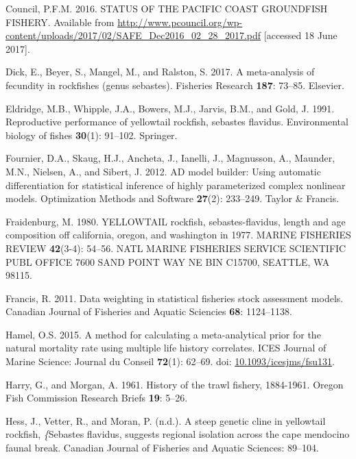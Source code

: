 \documentclass[12pt,]{article}
\begin{document}
\hypertarget{ref-PFMC2016}{}
Council, P.F.M. 2016. STATUS OF THE PACIFIC COAST GROUNDFISH FISHERY.
Available from
\url{http://www.pcouncil.org/wp-content/uploads/2017/02/SAFE_Dec2016_02_28_2017.pdf}
{[}accessed 18 June 2017{]}.

\hypertarget{ref-Dick2017}{}
Dick, E., Beyer, S., Mangel, M., and Ralston, S. 2017. A meta-analysis
of fecundity in rockfishes (genus sebastes). Fisheries Research
\textbf{187}: 73--85. Elsevier.

\hypertarget{ref-Eldridge1991}{}
Eldridge, M.B., Whipple, J.A., Bowers, M.J., Jarvis, B.M., and Gold, J.
1991. Reproductive performance of yellowtail rockfish, sebastes
flavidus. Environmental biology of fishes \textbf{30}(1): 91--102.
Springer.

\hypertarget{ref-Fournier2012}{}
Fournier, D.A., Skaug, H.J., Ancheta, J., Ianelli, J., Magnusson, A.,
Maunder, M.N., Nielsen, A., and Sibert, J. 2012. AD model builder: Using
automatic differentiation for statistical inference of highly
parameterized complex nonlinear models. Optimization Methods and
Software \textbf{27}(2): 233--249. Taylor \& Francis.

\hypertarget{ref-Fraidenburg1980}{}
Fraidenburg, M. 1980. YELLOWTAIL rockfish, sebastes-flavidus, length and
age composition off california, oregon, and washington in 1977. MARINE
FISHERIES REVIEW \textbf{42}(3-4): 54--56. NATL MARINE FISHERIES SERVICE
SCIENTIFIC PUBL OFFICE 7600 SAND POINT WAY NE BIN C15700, SEATTLE, WA
98115.

\hypertarget{ref-Francis2011}{}
Francis, R. 2011. Data weighting in statistical fisheries stock
assessment models. Canadian Journal of Fisheries and Aquatic Sciencies
\textbf{68}: 1124--1138.

\hypertarget{ref-Hamel2015}{}
Hamel, O.S. 2015. A method for calculating a meta-analytical prior for
the natural mortality rate using multiple life history correlates. ICES
Journal of Marine Science: Journal du Conseil \textbf{72}(1): 62--69.
doi:
\href{https://doi.org/10.1093/icesjms/fsu131}{10.1093/icesjms/fsu131}.

\hypertarget{ref-Harry1961}{}
Harry, G., and Morgan, A. 1961. History of the trawl fishery, 1884-1961.
Oregon Fish Commission Research Briefs \textbf{19}: 5--26.

\hypertarget{ref-Hess2011}{}
Hess, J., Vetter, R., and Moran, P. (n.d.). A steep genetic cline in
yellowtail rockfish, \emph{\{}Sebastes flavidus, suggests regional
isolation across the cape mendocino faunal break. Canadian Journal of
Fisheries and Aquatic Sciences: 89--104.
\end{document}
